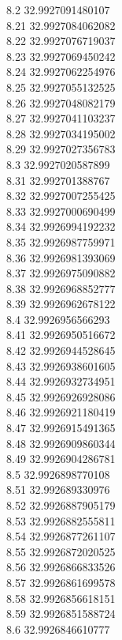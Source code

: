 {8.2	32.9927091480107\\
8.21	32.9927084062082\\
8.22	32.9927076719037\\
8.23	32.9927069450242\\
8.24	32.9927062254976\\
8.25	32.9927055132525\\
8.26	32.9927048082179\\
8.27	32.9927041103237\\
8.28	32.9927034195002\\
8.29	32.9927027356783\\
8.3	32.9927020587899\\
8.31	32.992701388767\\
8.32	32.9927007255425\\
8.33	32.9927000690499\\
8.34	32.9926994192232\\
8.35	32.9926987759971\\
8.36	32.9926981393069\\
8.37	32.9926975090882\\
8.38	32.9926968852777\\
8.39	32.9926962678122\\
8.4	32.9926956566293\\
8.41	32.9926950516672\\
8.42	32.9926944528645\\
8.43	32.9926938601605\\
8.44	32.9926932734951\\
8.45	32.9926926928086\\
8.46	32.9926921180419\\
8.47	32.9926915491365\\
8.48	32.9926909860344\\
8.49	32.9926904286781\\
8.5	32.9926898770108\\
8.51	32.992689330976\\
8.52	32.9926887905179\\
8.53	32.9926882555811\\
8.54	32.9926877261107\\
8.55	32.9926872020525\\
8.56	32.9926866833526\\
8.57	32.9926861699578\\
8.58	32.9926856618151\\
8.59	32.9926851588724\\
8.6	32.9926846610777\\
}
